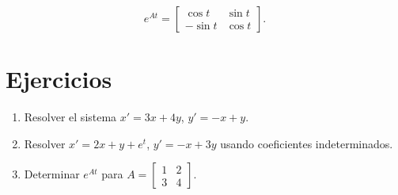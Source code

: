 \begin{equation}
e^{At} =
\begin{bmatrix} \cos t & \sin t \\ -\sin t & \cos t \end{bmatrix}.
\end{equation}

\section{Ejercicios}
\begin{enumerate}
    \item Resolver el sistema \( x' = 3x + 4y \), \( y' = -x + y \).
    \item Resolver \( x' = 2x + y + e^t \), \( y' = -x + 3y \) usando coeficientes indeterminados.
    \item Determinar \( e^{At} \) para \( A = \begin{bmatrix} 1 & 2 \\ 3 & 4 \end{bmatrix} \).
\end{enumerate}

